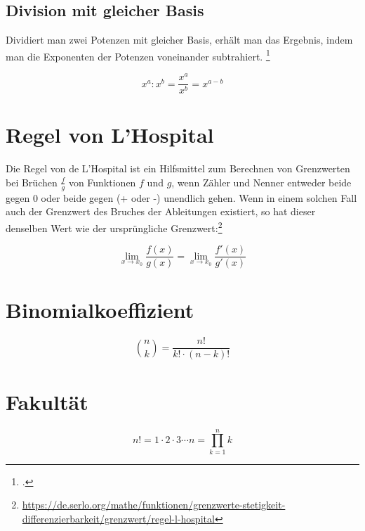 \documentclass{lehramt-informatik-haupt}
\begin{document}
%

\subsection{Division mit gleicher Basis}

Dividiert man zwei Potenzen mit gleicher Basis, erhält man das Ergebnis,
indem man die Exponenten der Potenzen voneinander subtrahiert.
\footcite[/potenzgesetze]{net:html:mathebibel}

\begin{displaymath}
x^a : x^b = \frac{x^a}{x^b} = x^{a-b}
\end{displaymath}

%

\section{Regel von L’Hospital}

Die Regel von de L’Hospital ist ein Hilfsmittel zum Berechnen von
Grenzwerten bei Brüchen $\frac{f}{g}$ von Funktionen $f$ und $g$, wenn
Zähler und Nenner entweder beide gegen $0$ oder beide gegen (+ oder -)
unendlich gehen. Wenn in einem solchen Fall auch der Grenzwert des
Bruches der Ableitungen existiert, so hat dieser denselben Wert wie der
ursprüngliche Grenzwert:\footnote{\url{https://de.serlo.org/mathe/funktionen/grenzwerte-stetigkeit-differenzierbarkeit/grenzwert/regel-l-hospital}}

\begin{displaymath}
\lim_{x \to x_0} \frac{f(x)}{g(x)} = \lim_{x \to x_0} \frac{f'(x)}{g'(x)}
\end{displaymath}

%

\section{Binomialkoeffizient}

\begin{displaymath}
\binom nk = \frac{n!}{k! \cdot (n-k)!}
\end{displaymath}

\section{Fakultät}

\begin{displaymath}
n! = 1\cdot 2 \cdot 3 \dotsm n = \prod_{k=1}^n k
\end{displaymath}
\end{document}
